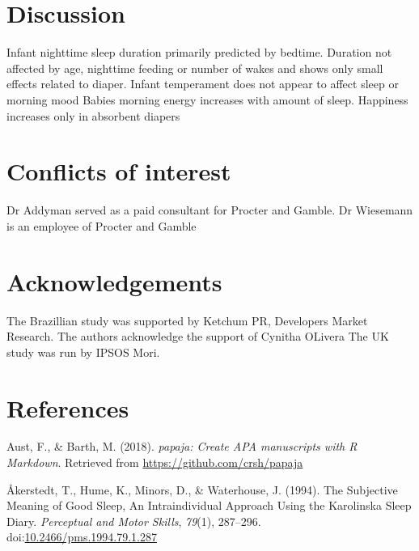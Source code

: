 \documentclass[man,floatsintext]{apa6}
\begin{document}
\hypertarget{discussion}{%
\section{Discussion}\label{discussion}}

Infant nighttime sleep duration primarily predicted by bedtime.
Duration not affected by age, nighttime feeding or number of wakes and shows only small effects related to diaper.
Infant temperament does not appear to affect sleep or morning mood
Babies morning energy increases with amount of sleep.
Happiness increases only in absorbent diapers

\hypertarget{conflicts-of-interest}{%
\section{Conflicts of interest}\label{conflicts-of-interest}}

Dr Addyman served as a paid consultant for Procter and Gamble. Dr Wiesemann is an employee of Procter and Gamble

\hypertarget{acknowledgements}{%
\section{Acknowledgements}\label{acknowledgements}}

The Brazillian study was supported by Ketchum PR, Developers Market Research. The authors acknowledge the support of Cynitha OLivera The UK study was run by IPSOS Mori.

\newpage

\hypertarget{references}{%
\section{References}\label{references}}

\begingroup
\setlength{\parindent}{-0.5in}
\setlength{\leftskip}{0.5in}

\hypertarget{refs}{}
\leavevmode\hypertarget{ref-R-papaja}{}%
Aust, F., \& Barth, M. (2018). \emph{papaja: Create APA manuscripts with R Markdown}. Retrieved from \url{https://github.com/crsh/papaja}

\leavevmode\hypertarget{ref-akerstedtSubjectiveMeaningGood1994}{}%
Åkerstedt, T., Hume, K., Minors, D., \& Waterhouse, J. (1994). The Subjective Meaning of Good Sleep, An Intraindividual Approach Using the Karolinska Sleep Diary. \emph{Perceptual and Motor Skills}, \emph{79}(1), 287--296. doi:\href{https://doi.org/10.2466/pms.1994.79.1.287}{10.2466/pms.1994.79.1.287}
\end{document}
